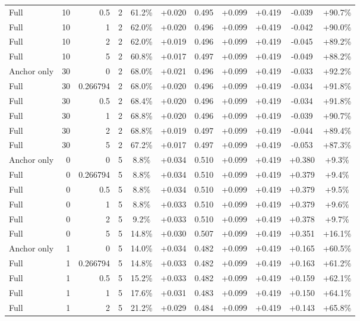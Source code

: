 \begin{table}[htbp]
\begin{tabular}{lrrrccccccc}
Full & 10 & 0.5 & 2 & 61.2\% & +0.020 & 0.495 & +0.099 & +0.419 & -0.039 & +90.7\% \\
Full & 10 & 1 & 2 & 62.0\% & +0.020 & 0.496 & +0.099 & +0.419 & -0.042 & +90.0\% \\
Full & 10 & 2 & 2 & 62.0\% & +0.019 & 0.496 & +0.099 & +0.419 & -0.045 & +89.2\% \\
Full & 10 & 5 & 2 & 60.8\% & +0.017 & 0.497 & +0.099 & +0.419 & -0.049 & +88.2\% \\
Anchor only & 30 & 0 & 2 & 68.0\% & +0.021 & 0.496 & +0.099 & +0.419 & -0.033 & +92.2\% \\
Full & 30 & 0.266794 & 2 & 68.0\% & +0.020 & 0.496 & +0.099 & +0.419 & -0.034 & +91.8\% \\
Full & 30 & 0.5 & 2 & 68.4\% & +0.020 & 0.496 & +0.099 & +0.419 & -0.034 & +91.8\% \\
Full & 30 & 1 & 2 & 68.8\% & +0.020 & 0.496 & +0.099 & +0.419 & -0.039 & +90.7\% \\
Full & 30 & 2 & 2 & 68.8\% & +0.019 & 0.497 & +0.099 & +0.419 & -0.044 & +89.4\% \\
Full & 30 & 5 & 2 & 67.2\% & +0.017 & 0.497 & +0.099 & +0.419 & -0.053 & +87.3\% \\
Anchor only & 0 & 0 & 5 & 8.8\% & +0.034 & 0.510 & +0.099 & +0.419 & +0.380 & +9.3\% \\
Full & 0 & 0.266794 & 5 & 8.8\% & +0.034 & 0.510 & +0.099 & +0.419 & +0.379 & +9.4\% \\
Full & 0 & 0.5 & 5 & 8.8\% & +0.034 & 0.510 & +0.099 & +0.419 & +0.379 & +9.5\% \\
Full & 0 & 1 & 5 & 8.8\% & +0.033 & 0.510 & +0.099 & +0.419 & +0.379 & +9.6\% \\
Full & 0 & 2 & 5 & 9.2\% & +0.033 & 0.510 & +0.099 & +0.419 & +0.378 & +9.7\% \\
Full & 0 & 5 & 5 & 14.8\% & +0.030 & 0.507 & +0.099 & +0.419 & +0.351 & +16.1\% \\
Anchor only & 1 & 0 & 5 & 14.0\% & +0.034 & 0.482 & +0.099 & +0.419 & +0.165 & +60.5\% \\
Full & 1 & 0.266794 & 5 & 14.8\% & +0.033 & 0.482 & +0.099 & +0.419 & +0.163 & +61.2\% \\
Full & 1 & 0.5 & 5 & 15.2\% & +0.033 & 0.482 & +0.099 & +0.419 & +0.159 & +62.1\% \\
Full & 1 & 1 & 5 & 17.6\% & +0.031 & 0.483 & +0.099 & +0.419 & +0.150 & +64.1\% \\
Full & 1 & 2 & 5 & 21.2\% & +0.029 & 0.484 & +0.099 & +0.419 & +0.143 & +65.8\% \\

\end{tabular}
\end{table}
